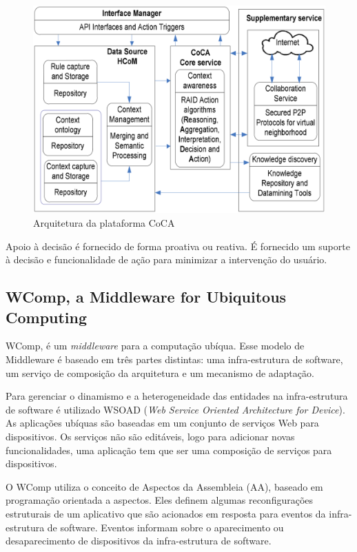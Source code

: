 \documentclass[12pt,a4paper,compsoc]{IEEEtran}
\begin{document}
  \begin{figure}[ht]
    \centerline{\includegraphics[scale=.2]{imagens/arquitetura-coca.png}}
    \caption{Arquitetura da plataforma CoCA \cite{ejigu2008hybrid}}
    \label{arquitetura-coca}
  \end{figure}
  
  Apoio à decisão é fornecido de forma proativa ou reativa. É fornecido um suporte à decisão e 
  funcionalidade de ação para minimizar a intervenção do usuário.


\subsection{WComp, a Middleware for Ubiquitous Computing}

  WComp, é um \textit{middleware} para a computação ubíqua. Esse modelo de Middleware é baseado em
  três partes distintas: uma infra-estrutura de software,  um serviço de composição da arquitetura e
  um mecanismo de adaptação.
  
  Para gerenciar o dinamismo e a heterogeneidade das entidades na infra-estrutura de software é
  utilizado WSOAD (\textit{Web Service Oriented Architecture for Device}). As aplicações ubíquas são
  baseadas em um conjunto de serviços Web para dispositivos. Os serviços não são editáveis, logo
  para adicionar novas funcionalidades, uma aplicação tem que ser uma composição de serviços para
  dispositivos.
  
  O WComp utiliza o conceito de Aspectos da Assembleia (AA), baseado em programação orientada a
  aspectos. Eles definem algumas reconfigurações estruturais de um aplicativo que são acionados em
  resposta para eventos da infra-estrutura de software. Eventos informam sobre o aparecimento ou
  desaparecimento de dispositivos da infra-estrutura de software.
  
\end{document}
